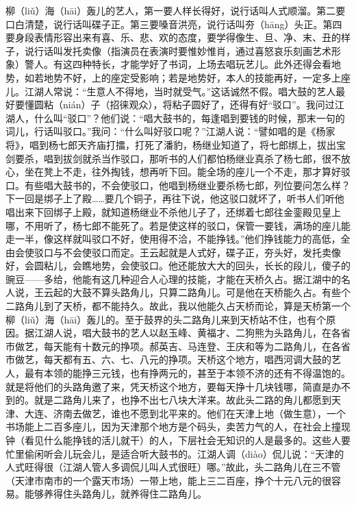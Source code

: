 \documentclass[12pt,UTF8]{ctexbook}
\begin{document}
柳（liǔ）海（hāi）轰儿的艺人，第一要人样长得好，说行话叫人式顺溜。第二要口白清楚，说行话叫碟子正。第三要嗓音洪亮，说行话叫夯（hāng）头正。第四要身段表情形容出来有喜、乐、悲、欢的态度，要学得像生、旦、净、末、丑的样子，说行话叫发托卖像（指演员在表演时要惟妙惟肖，通过喜怒哀乐刻画艺术形象）警人。有这四种特长，才能学好了书词，上场去唱玩艺儿。此外还得会看地势，如若地势不好，上的座定受影响；若是地势好，本人的技能再好，一定多上座儿。江湖人常说：“生意人不得地，当时就受气。”这话诚然不假。唱大鼓的艺人最好要懂圆粘（nián）子（招徕观众），将粘子圆好了，还得有好“驳口”。我问过江湖人，什么叫“驳口”？他们说：“唱大鼓书的，每逢唱到要钱的时候，那末一句的词儿，行话叫驳口。”我问：“什么叫好驳口呢？”江湖人说：“譬如唱的是《杨家将》，唱到杨七郎天齐庙打擂，打死了潘豹，杨继业知道了，将七郎绑上，拔出宝剑要杀，唱到拔剑就杀当作驳口，那听书的人们都怕杨继业真杀了杨七郎，很不放心，坐在凳上不走，往外掏钱，想再听下回。能全场的座儿一个不走，那才算好驳口。有些唱大鼓书的，不会使驳口，他唱到杨继业要杀杨七郎，列位要问怎么样？下一回是绑子上了殿……要几个铜子，再往下说，他这驳口就坏了，听书人们听他唱出来下回绑子上殿，就知道杨继业不杀他儿子了，还绑着七郎往金銮殿见皇上哪，不用听了，杨七郎不能死了。若是使这样的驳口，保管一要钱，满场的座儿能走一半，像这样就叫驳口不好，使用得不洽，不能挣钱。”他们挣钱能力的高低，全由会使驳口与不会使驳口而定。王云起就是人式好，碟子正，夯头好，发托卖像好，会圆粘儿，会瞧地势，会使驳口。他还能放大大的回头，长长的段儿，傻子的豌豆——多给，他能有这几种迎合人心理的技能，才能在天桥久占。据江湖中的名人说，王云起的大鼓不算头路角儿，只算二路角儿。可是他在天桥能久占。有些个二路角儿到了天桥，都不能持久。故此，我以他能久占天桥而论，算是天桥第一个柳（liǔ）海（hāi）轰儿的。至于鼓界的头二路角儿来到天桥站不住，也有个原因。据江湖人说，唱大鼓书的艺人以赵玉峰、黄福才、二狗熊为头路角儿，在各省市做艺，每天能有十数元的挣项。郝英吉、马连登、王庆和等为二路角儿，在各省市做艺，每天都有五、六、七、八元的挣项。天桥这个地方，唱西河调大鼓的艺人，最有本领的能挣三元钱，也有挣两元的，甚至于本领不济的还有不得温饱的。就是将他们的头路角邀了来，凭天桥这个地方，要每天挣十几块钱哪，简直是办不到的。就是二路角儿来了，也挣不出七八块大洋来。故此头二路的角儿都愿到天津、大连、济南去做艺，谁也不愿到北平来的。他们在天津上地（做生意），一个书场能上二百多座儿，因为天津那个地方是个码头，卖苦力气的人，在社会上撞现钟（看见什么能挣钱的活儿就干）的人，下层社会无知识的人是最多的。这些人要忙里偷闲听会儿玩会儿，是适合听大鼓书的。江湖人调（diào）侃儿说：“天津的人式旺得很（江湖人管人多调侃儿叫人式很旺）哪。”故此，头二路角儿在三不管（天津市南市的一个露天市场）一带上地，能上三二百座，挣个十元八元的很容易。能够养得住头路角儿，就养得住二路角儿。
\end{document}

